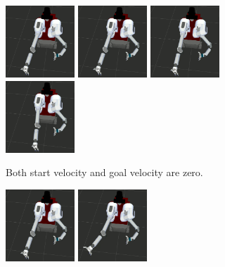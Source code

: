 \documentclass[letterpaper, 10 pt, conference]{ieeeconf}  %
\begin{document}
\begin{figure}[t!]
	\centering
	\begin{minipage}[t]{0.64\linewidth}
	\begin{subfigure}[b]{\textwidth}
		\centering
		\includegraphics[height=2.7cm]{fig/motivation/slow1}
		\includegraphics[height=2.7cm]{fig/motivation/slow2}
		\includegraphics[height=2.7cm]{fig/motivation/slow3}
		\includegraphics[height=2.7cm]{fig/motivation/slow4}
		\caption{Both start velocity and goal velocity are zero.}	\vspace{4pt}
		\label{fig:motivation:slow}
	\end{subfigure}
	\begin{subfigure}[b]{\textwidth}
		\centering
		\includegraphics[height=2.7cm]{fig/motivation/fast1}
		\includegraphics[height=2.7cm]{fig/motivation/fast2}

\end{subfigure}
\end{minipage}
\end{figure}
\end{document}
